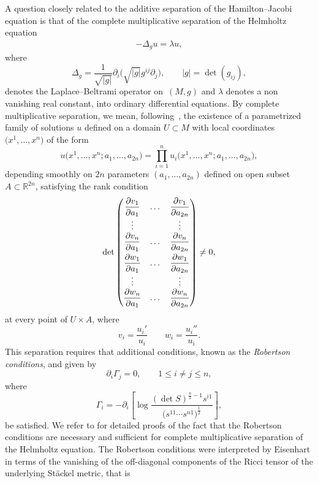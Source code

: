 \documentclass[11pt]{article}
\numberwithin{equation}{section}
\begin{document}
 A question closely related to the additive separation of the Hamilton--Jacobi equation is that of the complete multiplicative separation of the Helmholtz equation
 \begin{gather}\label{Helm}
-\Delta_{g} u =\lambda u,
\end{gather}
where
\[
\Delta_{g} = \frac{1}{\sqrt{|g|}}\partial_{i}\Big(\sqrt{|g|}g^{ij}\partial_{j}\Big),\qquad |g|=\det(g_{ij}),
\]
denotes the Laplace--Beltrami operator on~$(M,g)$ and $\lambda$ denotes a non vanishing real constant, into ordinary differential equations. By complete multiplicative separation, we mean, follo\-wing~\cite{BCR1-2002}, the existence of a parametrized family of solutions $u$ defined on a domain $U\subset M$ with local coordinates $\big(x^{1},\dots, x^{n}\big)$ of the form
\[
u\big(x^{1},\dots, x^{n};a_{1},\dots, a_{2n}\big)=\prod_{i=1}^{n}u_{i}\big(x^{1},\dots, x^{n};a_{1},\dots, a_{2n}\big),
\]
depending smoothly on $2n$ parameters $(a_{1},\dots, a_{2n})$ defined on open subset $A\subset {\mathbb R}^{2n}$, satisfying the rank condition
\begin{gather*}%
\det \left(
\begin{matrix}
\dfrac{\partial v_{1}}{\partial a_{1}}&\dots&\dfrac{\partial v_{1}}{\partial a_{2n}} \\
\vdots& & \vdots \\
\dfrac{\partial v_{n}}{\partial a_{1}}&\dots&\dfrac {\partial v_{n}}{\partial a_{2n}}\vspace{1mm}\\
\dfrac{\partial w_{1}}{\partial a_{1}}&\dots&\dfrac{\partial w_{1}}{\partial a_{2n}} \\
\vdots& & \vdots \\
\dfrac{\partial w_{n}}{\partial a_{1}}&\dots&\dfrac {\partial w_{n}}{\partial a_{2n}}
\end{matrix}
\right) \neq 0,
\end{gather*}
at every point of $U\times A$, where
\[
v_{i}=\frac{u_{i}'}{u_{i}} \qquad w_{i}=\frac{u_{i}''}{u_{i}}.
\]
This separation requires that additional conditions, known as the {\emph{Robertson conditions}}, and given by
\[
\partial_{i}\Gamma_{j}=0,\qquad 1\leq i\neq j\leq n,
\]
where
\[
\Gamma_{i}=-\partial_{i}\left[\log \frac{(\det S)^{\frac{n}{2}-1}s^{i1}}{\big(s^{11}\cdots s^{n1}\big)^{\frac{1}{2}}}\right],
\]
be satisfied. We refer to \cite{BCR1-2002,BCR2-2002,Eis1934,KaMi1980,KaMi1981,Rob1928} for detailed proofs of the fact that the Robertson conditions are necessary and sufficient for complete multiplicative separation of the Helmholtz equation. The Robertson conditions were interpreted by Eisenhart \cite{Eis1934} in terms of the vanishing of the off-diagonal components of the Ricci tensor of the underlying St\"ackel metric, that is
\end{document}
